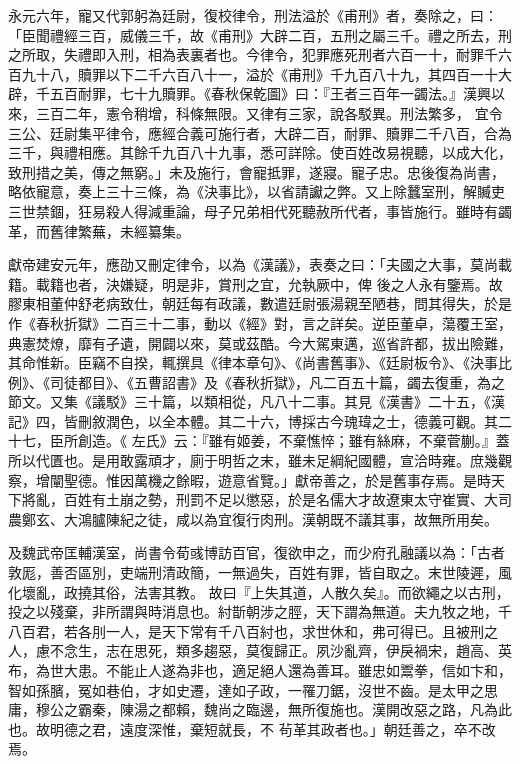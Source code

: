 \begin{pinyinscope}
 永元六年，寵又代郭躬為廷尉，復校律令，刑法溢於《甫刑》者，奏除之，曰：「臣聞禮經三百，威儀三千，故《甫刑》大辟二百，五刑之屬三千。禮之所去，刑之所取，失禮即入刑，相為表裏者也。今律令，犯罪應死刑者六百一十，耐罪千六百九十八，贖罪以下二千六百八十一，溢於《甫刑》千九百八十九，其四百一十大辟，千五百耐罪，七十九贖罪。《春秋保乾圖》曰：『王者三百年一蠲法。』漢興以來，三百二年，憲令稍增，科條無限。又律有三家，說各駁異。刑法繁多，
 宜令三公、廷尉集平律令，應經合義可施行者，大辟二百，耐罪、贖罪二千八百，合為三千，與禮相應。其餘千九百八十九事，悉可詳除。使百姓改易視聽，以成大化，致刑措之美，傳之無窮。」未及施行，會寵抵罪，遂寢。寵子忠。忠後復為尚書，略依寵意，奏上三十三條，為《決事比》，以省請讞之弊。又上除蠶室刑，解贓吏三世禁錮，狂易殺人得減重論，母子兄弟相代死聽赦所代者，事皆施行。雖時有蠲革，而舊律繁蕪，未經纂集。



 獻帝建安元年，應劭又刪定律令，以為《漢議》，表奏之曰：「夫國之大事，莫尚載籍。載籍也者，決嫌疑，明是非，賞刑之宜，允執厥中，俾
 後之人永有鑒焉。故膠東相董仲舒老病致仕，朝廷每有政議，數遣廷尉張湯親至陋巷，問其得失，於是作《春秋折獄》二百三十二事，動以《經》對，言之詳矣。逆臣董卓，蕩覆王室，典憲焚燎，靡有孑遺，開闢以來，莫或茲酷。今大駕東邁，巡省許都，拔出險難，其命惟新。臣竊不自揆，輒撰具《律本章句》、《尚書舊事》、《廷尉板令》、《決事比例》、《司徒都目》、《五曹詔書》及《春秋折獄》，凡二百五十篇，蠲去復重，為之節文。又集《議駁》三十篇，以類相從，凡八十二事。其見《漢書》二十五，《漢記》四，皆刪敘潤色，以全本體。其二十六，博採古今瑰瑋之士，德義可觀。其二十七，臣所創造。《
 左氏》云：『雖有姬姜，不棄憔悴；雖有絲麻，不棄菅蒯。』蓋所以代匱也。是用敢露頑才，廁于明哲之末，雖未足綱紀國體，宣洽時雍。庶幾觀察，增闡聖德。惟因萬機之餘暇，遊意省覽。」獻帝善之，於是舊事存焉。是時天下將亂，百姓有土崩之勢，刑罰不足以懲惡，於是名儒大才故遼東太守崔實、大司農鄭玄、大鴻臚陳紀之徒，咸以為宜復行肉刑。漢朝既不議其事，故無所用矣。



 及魏武帝匡輔漢室，尚書令荀彧博訪百官，復欲申之，而少府孔融議以為：「古者敦厖，善否區別，吏端刑清政簡，一無過失，百姓有罪，皆自取之。末世陵遲，風化壞亂，政撓其俗，法害其教。
 故曰『上失其道，人散久矣』。而欲繩之以古刑，投之以殘棄，非所謂與時消息也。紂斮朝涉之脛，天下謂為無道。夫九牧之地，千八百君，若各刖一人，是天下常有千八百紂也，求世休和，弗可得已。且被刑之人，慮不念生，志在思死，類多趨惡，莫復歸正。夙沙亂齊，伊戾禍宋，趙高、英布，為世大患。不能止人遂為非也，適足絕人還為善耳。雖忠如鬻拳，信如卞和，智如孫臏，冤如巷伯，才如史遷，達如子政，一罹刀鋸，沒世不齒。是太甲之思庸，穆公之霸秦，陳湯之都賴，魏尚之臨邊，無所復施也。漢開改惡之路，凡為此也。故明德之君，遠度深惟，棄短就長，不
 茍革其政者也。」朝廷善之，卒不改焉。




\end{pinyinscope}
